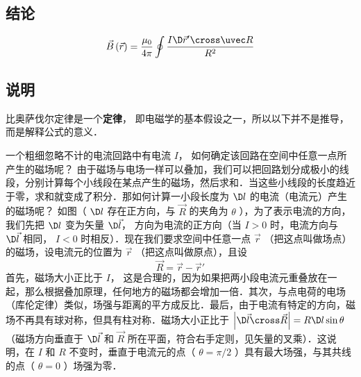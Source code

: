 
\subsection{结论}
\begin{equation}
\vec B\left( {\vec r} \right) = \frac{{{\mu _0}}}{{4\pi }}\oint {\frac{{I\D \vec r' \cross \uvec R}}{{{R^2}}}} 
\end{equation}
\subsection{说明}
比奥萨伐尔定律是一个\textbf{定律}， 即电磁学的基本假设之一，所以以下并不是推导，而是解释公式的意义．

一个粗细忽略不计的电流回路中有电流 $I$， 如何确定该回路在空间中任意一点所产生的磁场呢？ 由于磁场与电场一样可以叠加，我们可以把回路划分成极小的线段，分别计算每个小线段在某点产生的磁场，然后求和．当这些小线段的长度趋近于零，求和就变成了积分．那如何计算一小段长度为 $\D l$ 的电流（电流元）产生的磁场呢？ 如图（%
 $\D l$ 存在正方向，与 $\vec R$ 的夹角为 $\theta $ ），为了表示电流的方向，我们先把 $\D l$ 变为矢量 $\D \vec l$， 方向为电流的正方向（当 $I > 0$ 时，电流方向与 $\D \vec l$ 相同， $I < 0$ 时相反）．现在我们要求空间中任意一点 $\vec r$ （把这点叫做场点）的磁场，设电流元的位置为 $\vec r$ （把这点叫做原点），且设
\begin{equation}
\vec R = \vec r - \vec r'
\end{equation}
首先，磁场大小正比于 $I$， 这是合理的，因为如果把两小段电流元重叠放在一起，那么根据叠加原理，任何地方的磁场都会增加一倍．其次，与点电荷的电场（库伦定律）类似，场强与距离的平方成反比．最后，由于电流有特定的方向，磁场不再具有球对称，但具有柱对称．磁场大小正比于 $\left| {\D \vec l \cross \vec R} \right| = R \D l \sin \theta $ （磁场方向垂直于 $\D \vec l$ 和 $\vec R$ 所在平面，符合右手定则，见矢量的叉乘）．这说明，在 $I$ 和 $R$ 不变时，垂直于电流元的点（ $\theta  = \pi /2$ ）具有最大场强，与其共线的点（ $\theta  = 0$ ）场强为零．

